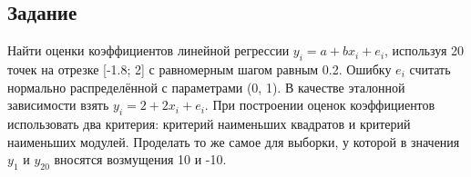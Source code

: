 \subsection{Задание}
Найти оценки коэффициентов линейной регрессии $y_{i} = a + bx_{i} + e_{i}$, используя 20 точек на отрезке [-1.8; 2] с равномерным шагом равным 0.2. Ошибку $e_{i}$ считать нормально распределённой с параметрами (0, 1). В качестве эталонной зависимости взять $y_{i} = 2 + 2x_{i} + e_{i}$. При построении оценок коэффициентов использовать два критерия: критерий наименьших квадратов и критерий наименьших модулей. Проделать то же самое для выборки, у которой в значения $y_{1}$ и $y_{20}$ вносятся возмущения 10 и -10. 
